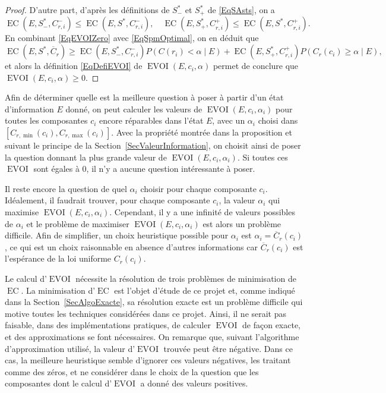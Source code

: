 \documentclass[a4paper,11pt]{article}
\theoremstyle{plain}
\theoremstyle{definition}
\DeclareMathOperator{\EC}{EC}
\DeclareMathOperator{\EVOI}{EVOI}
\begin{document}
\begin{proof}
D'autre part, d'après les définitions de $S_-^\ast$ et $S_+^\ast$ de \eqref{EqSAsts}, on a
\begin{equation}
\label{EqSpmOptimal}
\EC(E, S_-^\ast, C_{r, i}^-) \leq \EC(E, S^\ast, C_{r, i}^-), \quad \EC(E, S_+^\ast, C_{r, i}^+) \leq \EC(E, S^\ast, C_{r, i}^+).
\end{equation}
En combinant \eqref{EqEVOIZero} avec \eqref{EqSpmOptimal}, on en déduit que
\[
\EC(E, S^\ast, \overline C_r) \geq \EC(E, S_-^\ast, C_{r, i}^-) P(C(r_i) < \alpha \mid E) + \EC(E, S_+^\ast, C_{r, i}^+) P(C_r(c_i) \geq \alpha \mid E),
\]
et alors la définition \eqref{EqDefiEVOI} de $\EVOI(E, c_i, \alpha)$ permet de conclure que $\EVOI(E, c_i, \alpha) \geq 0$.
\end{proof}

Afin de déterminer quelle est la meilleure question à poser à partir d'un état d'information $E$ donné, on peut calculer les valeurs de $\EVOI(E, c_i, \alpha_i)$ pour toutes les composantes $c_i$ encore réparables dans l'état $E$, avec un $\alpha_i$ choisi dans $[C_{r, \min}(c_i), C_{r, \max}(c_i)]$. Avec la propriété montrée dans la proposition et suivant le principe de la Section~\ref{SecValeurInformation}, on choisit ainsi de poser la question donnant la plus grande valeur de $\EVOI(E, c_i, \alpha_i)$. Si toutes ces $\EVOI$ sont égales à $0$, il n'y a aucune question intéressante à poser.

Il reste encore la question de quel $\alpha_i$ choisir pour chaque composante $c_i$. Idéalement, il faudrait trouver, pour chaque composante $c_i$, la valeur $\alpha_i$ qui maximise $\EVOI(E, c_i, \alpha_i)$. Cependant, il y a une infinité de valeurs possibles de $\alpha_i$ et le problème de maximiser $\EVOI(E, c_i, \alpha_i)$ est alors un problème difficile. Afin de simplifier, un choix heuristique possible pour $\alpha_i$ est $\alpha_i = \overline C_r(c_i)$, ce qui est un choix raisonnable en absence d'autres informations car $\overline C_r(c_i)$ est l'espérance de la loi uniforme $C_r(c_i)$.

Le calcul d'$\EVOI$ nécessite la résolution de trois problèmes de minimisation de $\EC$. La minimisation d'$\EC$ est l'objet d'étude de ce projet et, comme indiqué dans la Section~\ref{SecAlgoExacte}, sa résolution exacte est un problème difficile qui motive toutes les techniques considérées dans ce projet. Ainsi, il ne serait pas faisable, dans des implémentations pratiques, de calculer $\EVOI$ de façon exacte, et des approximations se font nécessaires. On remarque que, suivant l'algorithme d'approximation utilisé, la valeur d'$\EVOI$ trouvée peut être négative. Dans ce cas, la meilleure heuristique semble d'ignorer ces valeurs négatives, les traitant comme des zéros, et ne considérer dans le choix de la question que les composantes dont le calcul d'$\EVOI$ a donné des valeurs positives.
\end{document}
